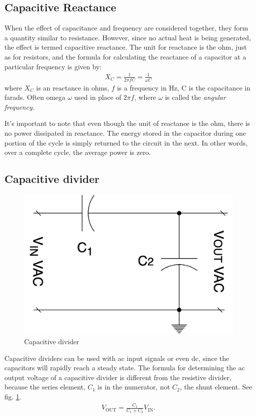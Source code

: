 \documentclass[../../document]{subfiles}
\begin{document}
\subsection{Capacitive Reactance}
When the effect of capacitance and frequency are considered together, they
form a quantity similar to resistance. However, since no actual heat is being
generated, the effect is termed capacitive reactance. The unit for reactance
is the ohm, just as for resistors, and the formula for calculating the
reactance of a capacitor at a particular frequency is given by:
\begin{gather}
	X_C=\frac{1}{2\pi fC}=\frac{1}{\omega C} \tag{Capacitive reactance}
\end{gather} 
where \(X_C\) is an reactance in ohms, \(f\) is a frequency in \unit{\hertz}, C
is the capacitance in farads. Often omega \(\omega\) used in place of \(2\pi
f\), where \(\omega\) is called the \emph{angular frequency}.
\cite{practical_electronics}

It’s important to note that even though the unit of reactance is the ohm, there
is no power dissipated in reactance. The energy stored in the capacitor during
one portion of the cycle is simply returned to the circuit in the next. In
other words, over a complete cycle, the average power is zero.
\cite{practical_electronics}

\subsection{Capacitive divider}
\begin{figure}
	\begin{center}
		\includegraphics[width=\linewidth]{capacitive_divider.drawio.png}
	\end{center}
	\caption{Capacitive divider}\label{fig:capacitive_divider}
\end{figure}
Capacitive dividers can be used with ac input signals or even dc, since the
capacitors will rapidly reach a steady state. The formula for determining the
ac output voltage of a capacitive divider is different from the resistive
divider, because the series element, \(C_1\) is in the numerator, not \(C_2\), the
shunt element. See fig. \ref{fig:capacitive_divider}.
\begin{gather}
	V_{\text{OUT}} = \frac{C_1}{C_1+C_2}V_{\text{IN}}.
\end{gather}
\end{document}
